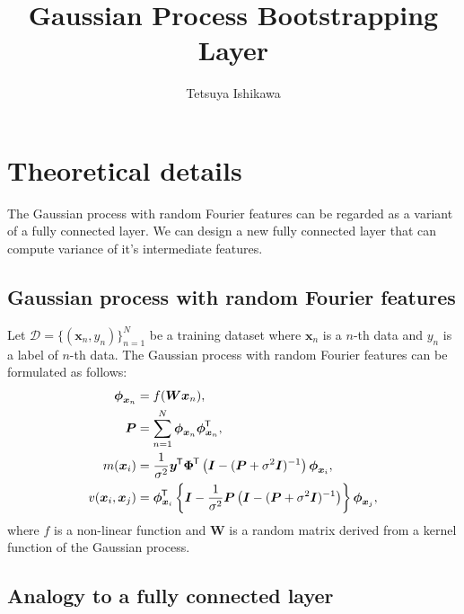 \documentclass[a4paper,onecolumn]{article}
\title{Gaussian Process Bootstrapping Layer}
\author{Tetsuya Ishikawa}
\begin{document}
\maketitle
\thispagestyle{fancy}

\section{Theoretical details}

The Gaussian process with random Fourier features can be regarded as a variant of a fully connected layer.
We can design a new fully connected layer that can compute variance of it's intermediate features.

\subsection{Gaussian process with random Fourier features}

Let $\mathcal{D} = \{ (\boldsymbol{x}_n, y_n) \}_{n=1}^{N}$ be a training dataset where
$\boldsymbol{x}_n$ is a $n$-th data and $y_n$ is a label of $n$-th data.
The Gaussian process with random Fourier features can be formulated as follows:
\begin{align}
    \boldsymbol{\phi}_{\boldsymbol{x}_n}
    &= f(\boldsymbol{Wx}_n), \\
    \boldsymbol{P}
    &= \sum_{n = 1}^{N} \boldsymbol{\phi}_{\boldsymbol{x}_n}
    \boldsymbol{\phi}_{\boldsymbol{x}_n}^{\mkern-1.5mu\mathsf{T}}, \\
    m(\boldsymbol{x}_i)
    &= \frac{1}{\sigma^2} \boldsymbol{y}^{\mkern-1.5mu\mathsf{T}} \boldsymbol{\Phi}^{\mkern-1.5mu\mathsf{T}}
    \left( \boldsymbol{I} - (\boldsymbol{P} + \sigma^2 \boldsymbol{I})^{-1} \right) \boldsymbol{\phi}_{\boldsymbol{x}_i}, \\
    v(\boldsymbol{x}_i, \boldsymbol{x}_j)
    &= \boldsymbol{\phi}_{\boldsymbol{x}_i}^{\mkern-1.5mu\mathsf{T}} \left\{
    \boldsymbol{I} - \frac{1}{\sigma^2} \boldsymbol{P} \left( \boldsymbol{I} - (\boldsymbol{P} + \sigma^2 \boldsymbol{I})^{-1} \right)
    \right\} \boldsymbol{\phi}_{\boldsymbol{x}_j},
    \label{eqn:gp_variance}
\end{align}
where $f$ is a non-linear function and $\boldsymbol{W}$ is a random matrix derived from a kernel function of the Gaussian process.

\subsection{Analogy to a fully connected layer}
\end{document}
